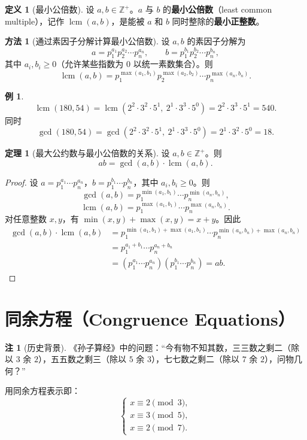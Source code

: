 \documentclass[UTF8,11pt,a4paper]{ctexbook}   %
\theoremstyle{definition}
\newtheorem{definition}{定义}[section]
\newtheorem{theorem}{定理}[section]
\newtheorem{example}{例}[section]
\newtheorem{remark}{注}[section]
\newtheorem{method}{方法}[section]
\DeclareMathOperator{\lcm}{lcm}
\begin{document}
\begin{definition}[最小公倍数]
设 $a,b\in\mathbb{Z}^+$。$a$ 与 $b$ 的\textbf{最小公倍数}（least common multiple），记作 $\lcm(a,b)$，是能被 $a$ 和 $b$ 同时整除的\textbf{最小正整数}。
\end{definition}

\begin{method}[通过素因子分解计算最小公倍数]
设 $a,b$ 的素因子分解为
\[
a=p_1^{a_1}p_2^{a_2}\cdots p_n^{a_n},\qquad
b=p_1^{b_1}p_2^{b_2}\cdots p_n^{b_n},
\]
其中 $a_i,b_i\ge 0$（允许某些指数为 $0$ 以统一素数集合）。则
\[
\lcm(a,b)=p_1^{\max(a_1,b_1)}p_2^{\max(a_2,b_2)}\cdots p_n^{\max(a_n,b_n)}.
\]
\end{method}

\begin{example}
\[
\lcm(180,54)=\lcm(2^2\cdot 3^2\cdot 5^1,\ 2^1\cdot 3^3\cdot 5^0)=2^2\cdot 3^3\cdot 5^1=540.
\]
同时
\[
\gcd(180,54)=\gcd(2^2\cdot 3^2\cdot 5^1,\ 2^1\cdot 3^3\cdot 5^0)=2^1\cdot 3^2\cdot 5^0=18.
\]
\end{example}

\begin{theorem}[最大公约数与最小公倍数的关系]
设 $a,b\in\mathbb{Z}^+$。则
\[
ab=\gcd(a,b)\cdot\lcm(a,b).
\]
\end{theorem}

\begin{proof}
设 $a=p_1^{a_1}\cdots p_n^{a_n}$，$b=p_1^{b_1}\cdots p_n^{b_n}$，其中 $a_i,b_i\ge 0$。则
\[
\gcd(a,b)=p_1^{\min(a_1,b_1)}\cdots p_n^{\min(a_n,b_n)},
\]
\[
\lcm(a,b)=p_1^{\max(a_1,b_1)}\cdots p_n^{\max(a_n,b_n)}.
\]
对任意整数 $x,y$，有 $\min(x,y)+\max(x,y)=x+y$。因此
\begin{align*}
\gcd(a,b)\cdot\lcm(a,b)
&=p_1^{\min(a_1,b_1)+\max(a_1,b_1)}\cdots p_n^{\min(a_n,b_n)+\max(a_n,b_n)}\\
&=p_1^{a_1+b_1}\cdots p_n^{a_n+b_n}\\
&=(p_1^{a_1}\cdots p_n^{a_n})(p_1^{b_1}\cdots p_n^{b_n})=ab.
\end{align*}
\end{proof}

\section{同余方程（Congruence Equations）}

\begin{remark}[历史背景]
《孙子算经》中的问题：``今有物不知其数，三三数之剩二（除以 $3$ 余 $2$），五五数之剩三（除以 $5$ 余 $3$），七七数之剩二（除以 $7$ 余 $2$），问物几何？''

用同余方程表示即：
\[
\begin{cases}
x\equiv 2\pmod 3,\\
x\equiv 3\pmod 5,\\
x\equiv 2\pmod 7.
\end{cases}
\]
\end{remark}
\end{document}
